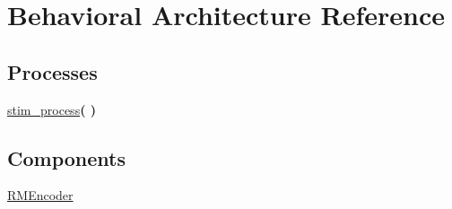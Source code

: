 \hypertarget{classtb___r_m_encoder_1_1_behavioral}{\section{Behavioral Architecture Reference}
\label{classtb___r_m_encoder_1_1_behavioral}
}
\subsection*{Processes}
 \begin{DoxyCompactItemize}
\item 
\hypertarget{classtb___r_m_encoder_1_1_behavioral_aee7e8b077315d73d2c245522dd7ba9a8}{\hyperlink{classtb___r_m_encoder_1_1_behavioral_aee7e8b077315d73d2c245522dd7ba9a8}{stim\+\_\+process}{\bfseries  (  )}}\label{classtb___r_m_encoder_1_1_behavioral_aee7e8b077315d73d2c245522dd7ba9a8}

\end{DoxyCompactItemize}
\subsection*{Components}
 \begin{DoxyCompactItemize}
\item 
\hypertarget{classtb___r_m_encoder_1_1_behavioral_ga338c5c28a63318ccdef8b2636aaddbc2}{\hyperlink{group___r_m_encoder_ga338c5c28a63318ccdef8b2636aaddbc2}{R\+M\+Encoder}  {\bfseries }  }\label{classtb___r_m_encoder_1_1_behavioral_ga338c5c28a63318ccdef8b2636aaddbc2}

\end{DoxyCompactItemize}

